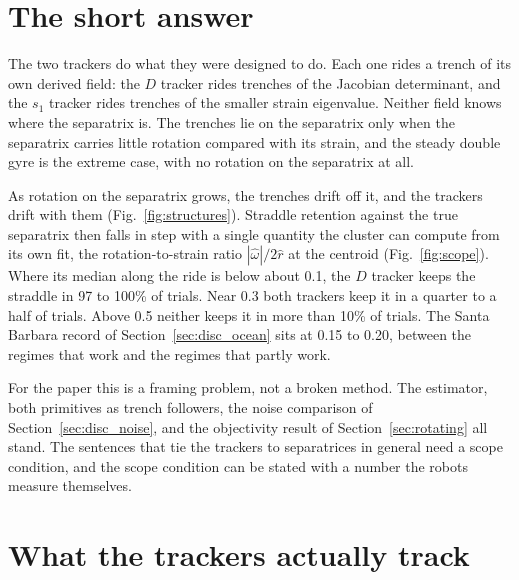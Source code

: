 \documentclass[11pt]{article}
\newcommand{\Dtr}{$D$ tracker}
\newcommand{\Str}{$s_1$ tracker}
\begin{document}
\section{The short answer}

The two trackers do what they were designed to do. Each one rides a trench
of its own derived field: the \Dtr{} rides trenches of the Jacobian
determinant, and the \Str{} rides trenches of the smaller strain
eigenvalue. Neither field knows where the separatrix is. The trenches lie
on the separatrix only when the separatrix carries little rotation
compared with its strain, and the steady double gyre is the extreme case,
with no rotation on the separatrix at all.

As rotation on the separatrix grows, the trenches drift off it, and the
trackers drift with them (Fig.~\ref{fig:structures}). Straddle retention
against the true separatrix then falls in step with a single quantity the
cluster can compute from its own fit, the rotation-to-strain ratio
$|\hat\omega|/2\hat r$ at the centroid (Fig.~\ref{fig:scope}). Where its
median along the ride is below about 0.1, the \Dtr{} keeps the straddle in
97 to 100\% of trials. Near 0.3 both trackers keep it in a quarter to a
half of trials. Above 0.5 neither keeps it in more than 10\% of trials. The Santa Barbara record of
Section~\ref{sec:disc_ocean} sits at 0.15 to 0.20, between the regimes
that work and the regimes that partly work.

For the paper this is a framing problem, not a broken method. The
estimator, both primitives as trench followers, the noise comparison of
Section~\ref{sec:disc_noise}, and the objectivity result of
Section~\ref{sec:rotating} all stand. The sentences that tie the trackers
to separatrices in general need a scope condition, and the scope condition
can be stated with a number the robots measure themselves.

\section{What the trackers actually track}
\label{sec:what}
\end{document}
